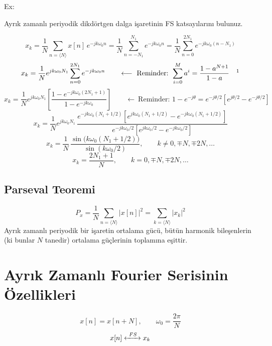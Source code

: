 \documentclass[11pt,a4paper]{article}
\begin{document}
\begin{ornek}
Ex:
\begin{center}
\end{center}
Ayrık zamanlı periyodik dikdörtgen dalga işaretinin FS katsayılarını bulunuz.
\end{ornek}
\[ x_k=\frac{1}{N}\sum_{n=\langle N\rangle} x[n]\,e^{-jk\omega_0 n}=\frac{1}{N}\sum_{n=-N_1}^{N_1} e^{-jk\omega_0 n}=\frac{1}{N}\sum_{n=0}^{2N_1} e^{-jk\omega_0 (n-N_1)} \]
\[ x_k=\frac{1}{N}e^{jk\omega_0 N_1}\sum_{n=0}^{2N_1} e^{-jk\omega_0 n} \qquad\longleftarrow\ \text{Reminder: } \sum_{i=0}^{M} a^i=\frac{1-a^{N+1}}{1-a}\quad\text{\footnotemark} \]
\[ x_k=\frac{1}{N}e^{jk\omega_0 N_1}\left[\frac{1-e^{-jk\omega_0(2N_1+1)}}{1-e^{-jk\omega_0}}\right] \qquad\longleftarrow\ \text{Reminder: } 1-e^{-j\theta}=e^{-j\theta/2}\left[e^{j\theta/2}-e^{-j\theta/2}\right] \]
\[ x_k=\frac{1}{N}e^{jk\omega_0 N_1}\,\frac{e^{-jk\omega_0(N_1+1/2)}\left[e^{jk\omega_0(N_1+1/2)}-e^{-jk\omega_0(N_1+1/2)}\right]}{e^{-jk\omega_0/2}\left[e^{jk\omega_0/2}-e^{-jk\omega_0/2}\right]} \]
\[ x_k=\frac{1}{N}\,\frac{\sin\bigl(k\omega_0(N_1+1/2)\bigr)}{\sin(k\omega_0/2)}, \qquad k\neq 0,\mp N,\mp 2N,\dots \]
\[ x_k=\frac{2N_1+1}{N}, \qquad k=0,\mp N,\mp 2N,\dots \]

\subsection{Parseval Teoremi}
\[ P_x=\frac{1}{N}\sum_{n=\langle N\rangle} |x[n]|^2=\sum_{k=\langle N\rangle} |x_k|^2 \]
Ayrık zamanlı periyodik bir işaretin ortalama gücü, bütün harmonik bileşenlerin (ki bunlar $N$ tanedir) ortalama güçlerinin toplamına eşittir.

\section{Ayrık Zamanlı Fourier Serisinin Özellikleri}
\[ x[n]=x[n+N], \qquad \omega_0=\frac{2\pi}{N} \]
\[ x[n] \xleftrightarrow{\ FS\ } x_k \]
\end{document}
